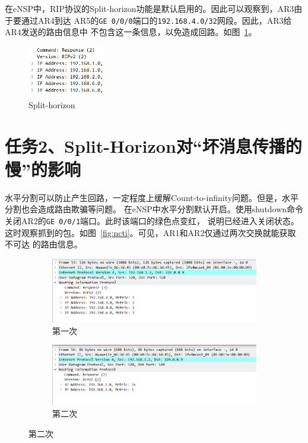 \documentclass[a4paper,twoside]{article}
\begin{document}
\begin{spacing}{1.2}
在eNSP中，RIP协议的Split-horizon功能是默认启用的。因此可以观察到，AR3由于要通过AR4到达
AR5的\texttt{GE 0/0/0}端口的\texttt{192.168.4.0/32}网段。因此，AR3给AR4发送的路由信息中
不包含这一条信息，以免造成回路。如图~\ref{fig:ar3rip}。
\begin{figure}[htb]
	\centering
	\caption{Split-horizon}
	\label{fig:ar3rip}
	\includegraphics[width=0.3\textwidth]{sh.png} 
\end{figure}

\section{任务2、Split-Horizon对“坏消息传播的慢”的影响}

水平分割可以防止产生回路，一定程度上缓解Count-to-infinity问题。但是，水平分割也会造成路由欺骗等问题。
在eNSP中水平分割默认开启。使用shutdown命令关闭AR2的\texttt{GE 0/0/1}端口。此时该端口的绿色点变红，
说明已经进入关闭状态。这时观察抓到的包。如图~\ref{fig:ncti}。可见，AR1和AR2仅通过两次交换就能获取不可达
的路由信息。
\begin{figure}[htbp]
	\centering
	\caption{关闭AR2后的路由信息}
	\label{fig:ncti}
	\begin{subfigure}{0.4\textwidth}
		\centering
		\includegraphics[width=\textwidth]{s1.png}
		\caption{第一次}
		\label{fig:ncti1}
	\end{subfigure}
	\begin{subfigure}{0.4\textwidth}
		\centering
		\includegraphics[width=\textwidth]{s16.png}
		\caption{第二次}
		\label{fig:ncti2}
	\end{subfigure}
\end{figure}


\end{spacing}
\end{document}
